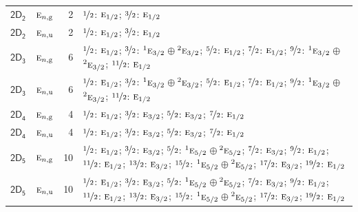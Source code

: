 \documentclass[10pt,a4paper]{article}
\numberwithin{equation}{section}
\newcommand{\grp}[1]{\mathsf{#1}}
\newcommand{\irr}[1]{\text{\normalfont\scshape #1}}
\newcommand{\conjpair}[1]{{}^{#1}}
\newcommand{\ptag}[1]{\mathrm{#1}}
\newlength{\fillwidth}\newlength{\cellwidth}\newlength{\colwidth}
\begin{document}
{\begin{longtable}{@{}llr>{\RaggedRight\arraybackslash}p{\fillwidth}@{}}
\href{2D2.pdf}{$\grp{2D_{2}}$} & $\irr{e}_{n,\ptag{g}}$ & 2 & $\nicefrac{1}{2}$: $\irr{e}_{1/2}$; $\nicefrac{3}{2}$: $\irr{e}_{1/2}$\\
\href{2D2.pdf}{$\grp{2D_{2}}$} & $\irr{e}_{n,\ptag{u}}$ & 2 & $\nicefrac{1}{2}$: $\irr{e}_{1/2}$; $\nicefrac{3}{2}$: $\irr{e}_{1/2}$\\
\href{2D3.pdf}{$\grp{2D_{3}}$} & $\irr{e}_{n,\ptag{g}}$ & 6 & $\nicefrac{1}{2}$: $\irr{e}_{1/2}$; $\nicefrac{3}{2}$: $\conjpair{1}\irr{e}_{3/2}$${}\oplus{}$$\conjpair{2}\irr{e}_{3/2}$; $\nicefrac{5}{2}$: $\irr{e}_{1/2}$; $\nicefrac{7}{2}$: $\irr{e}_{1/2}$; $\nicefrac{9}{2}$: $\conjpair{1}\irr{e}_{3/2}$${}\oplus{}$$\conjpair{2}\irr{e}_{3/2}$; $\nicefrac{11}{2}$: $\irr{e}_{1/2}$\\
\href{2D3.pdf}{$\grp{2D_{3}}$} & $\irr{e}_{n,\ptag{u}}$ & 6 & $\nicefrac{1}{2}$: $\irr{e}_{1/2}$; $\nicefrac{3}{2}$: $\conjpair{1}\irr{e}_{3/2}$${}\oplus{}$$\conjpair{2}\irr{e}_{3/2}$; $\nicefrac{5}{2}$: $\irr{e}_{1/2}$; $\nicefrac{7}{2}$: $\irr{e}_{1/2}$; $\nicefrac{9}{2}$: $\conjpair{1}\irr{e}_{3/2}$${}\oplus{}$$\conjpair{2}\irr{e}_{3/2}$; $\nicefrac{11}{2}$: $\irr{e}_{1/2}$\\
\href{2D4.pdf}{$\grp{2D_{4}}$} & $\irr{e}_{n,\ptag{g}}$ & 4 & $\nicefrac{1}{2}$: $\irr{e}_{1/2}$; $\nicefrac{3}{2}$: $\irr{e}_{3/2}$; $\nicefrac{5}{2}$: $\irr{e}_{3/2}$; $\nicefrac{7}{2}$: $\irr{e}_{1/2}$\\
\href{2D4.pdf}{$\grp{2D_{4}}$} & $\irr{e}_{n,\ptag{u}}$ & 4 & $\nicefrac{1}{2}$: $\irr{e}_{1/2}$; $\nicefrac{3}{2}$: $\irr{e}_{3/2}$; $\nicefrac{5}{2}$: $\irr{e}_{3/2}$; $\nicefrac{7}{2}$: $\irr{e}_{1/2}$\\
\href{2D5.pdf}{$\grp{2D_{5}}$} & $\irr{e}_{n,\ptag{g}}$ & 10 & $\nicefrac{1}{2}$: $\irr{e}_{1/2}$; $\nicefrac{3}{2}$: $\irr{e}_{3/2}$; $\nicefrac{5}{2}$: $\conjpair{1}\irr{e}_{5/2}$${}\oplus{}$$\conjpair{2}\irr{e}_{5/2}$; $\nicefrac{7}{2}$: $\irr{e}_{3/2}$; $\nicefrac{9}{2}$: $\irr{e}_{1/2}$; $\nicefrac{11}{2}$: $\irr{e}_{1/2}$; $\nicefrac{13}{2}$: $\irr{e}_{3/2}$; $\nicefrac{15}{2}$: $\conjpair{1}\irr{e}_{5/2}$${}\oplus{}$$\conjpair{2}\irr{e}_{5/2}$; $\nicefrac{17}{2}$: $\irr{e}_{3/2}$; $\nicefrac{19}{2}$: $\irr{e}_{1/2}$\\
\href{2D5.pdf}{$\grp{2D_{5}}$} & $\irr{e}_{n,\ptag{u}}$ & 10 & $\nicefrac{1}{2}$: $\irr{e}_{1/2}$; $\nicefrac{3}{2}$: $\irr{e}_{3/2}$; $\nicefrac{5}{2}$: $\conjpair{1}\irr{e}_{5/2}$${}\oplus{}$$\conjpair{2}\irr{e}_{5/2}$; $\nicefrac{7}{2}$: $\irr{e}_{3/2}$; $\nicefrac{9}{2}$: $\irr{e}_{1/2}$; $\nicefrac{11}{2}$: $\irr{e}_{1/2}$; $\nicefrac{13}{2}$: $\irr{e}_{3/2}$; $\nicefrac{15}{2}$: $\conjpair{1}\irr{e}_{5/2}$${}\oplus{}$$\conjpair{2}\irr{e}_{5/2}$; $\nicefrac{17}{2}$: $\irr{e}_{3/2}$; $\nicefrac{19}{2}$: $\irr{e}_{1/2}$\\

\end{longtable}}
\end{document}

